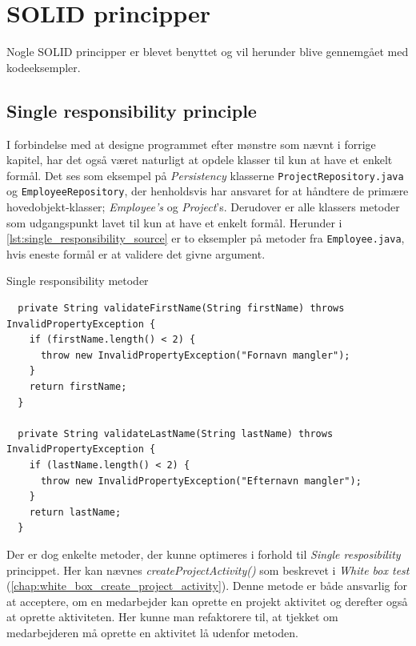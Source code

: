 \section{SOLID principper} \label{chap:solid}
Nogle SOLID principper er blevet benyttet og vil herunder blive gennemgået med kodeeksempler.
\subsection{Single responsibility principle} \label{sec:solid_s}
I forbindelse med at designe programmet efter mønstre som nævnt i forrige kapitel, har det også været naturligt at opdele klasser til kun at have et enkelt formål. Det ses som eksempel på \textit{Persistency} klasserne \texttt{ProjectRepository.java} og \texttt{EmployeeRepository}, der henholdsvis har ansvaret for at håndtere de primære hovedobjekt-klasser; \textit{Employee's} og \textit{Project}'s.
Derudover er alle klassers metoder som udgangspunkt lavet til kun at have et enkelt formål. Herunder i \cref{lst:single_responsibility_source} er to eksempler på metoder fra \texttt{Employee.java}, hvis eneste formål er at validere det givne argument.
\begin{listing}[H]
  \centering
  \caption{Single responsibility metoder}\label{lst:single_responsibility_source}
  \begin{verbatim}
  private String validateFirstName(String firstName) throws InvalidPropertyException {
    if (firstName.length() < 2) {
      throw new InvalidPropertyException("Fornavn mangler");
    }
    return firstName;
  }

  private String validateLastName(String lastName) throws InvalidPropertyException {
    if (lastName.length() < 2) {
      throw new InvalidPropertyException("Efternavn mangler");
    }
    return lastName;
  }

    \end{verbatim}
\end{listing}
Der er dog enkelte metoder, der kunne optimeres i forhold til \textit{Single resposibility} princippet. Her kan nævnes \textit{createProjectActivity()} som beskrevet i \textit{White box test} (\cref{chap:white_box_create_project_activity}). Denne metode er både ansvarlig for at acceptere, om en medarbejder kan oprette en projekt aktivitet og derefter også at oprette aktiviteten. Her kunne man refaktorere til, at tjekket om medarbejderen må oprette en aktivitet lå udenfor metoden.
